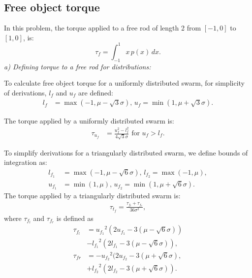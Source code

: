 \subsection{Free object torque}
In this problem, the torque applied to a free rod of length 2 from $[-1,0]$ to $[1,0]$, is:
\begin{equation}
\tau_{f} = \int_{-1}^1 x\,p(x)\, dx .
\end{equation}
\emph{a) Defining torque to a free rod for distributions:}

To calculate free object torque for a uniformly distributed swarm, for simplicity of derivations, $l_f$ and $u_f$ are defined: 
\begin{align}
l_f &= \max({-1,\mu -\sqrt{3} \sigma}),\, u_f = \min({1,\mu+\sqrt{3}\sigma}).
\end{align}

The torque applied by a uniformly distributed swarm is:
\begin{align}
\tau_{u_f} &= \frac{u_f^2-l_f^2}{4\sqrt{3}\sigma} \textrm{  for    }  u_f>l_f .
\end{align}

To simplify derivations for a triangularly distributed swarm, we define bounds of integration as:
\begin{align}
l_{f_1} &= \max({-1,\mu-\sqrt{6}\sigma}), \,l_{f_2} = \max({-1,\mu}),\\ \nonumber
u_{f_1} &= \min({1,\mu}), \, u_{f_2} = \min({1,\mu+\sqrt{6}\sigma}) . \nonumber
\end{align}
The torque applied by a triangularly distributed swarm is:
\begin{align}
\tau_{t_f} = \frac{\tau_{f_l}+ \tau_{f_r}}{36\sigma^2},
\end{align}
where $\tau_{f_l}$ and $\tau_{f_r}$ is defined as
\begin{align}\nonumber
\tau_{f_l} &=  {u_{f_1}}^2(2u_{f_1} - 3(\mu-\sqrt{6}\sigma)) \\ \nonumber
&-{l_{f_1}}^2(2{l_{f_1}}-3(\mu-\sqrt{6}\sigma)) , \\ \nonumber %
\tau_{fr} &=-{u_{f_2}}^2(2u_{f_2} -3(\mu+\sqrt{6}\sigma) , \\ \nonumber
&+ {l_{f_2}}^2(2{l_{f_2}}-3(\mu+\sqrt{6}\sigma)) . \\ \nonumber%
\end{align}

